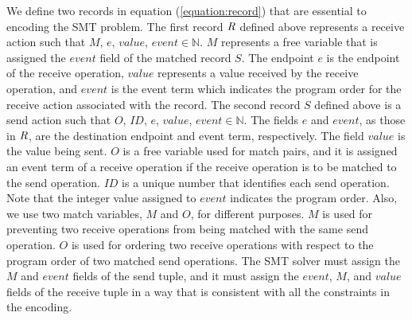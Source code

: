 We define two records in equation (\ref{equation:record}) that are essential to encoding the SMT problem. The first record $\emph{R}$ defined above represents a receive action such that $\mathit{M}$, $\mathit{e}$, $\mathit{value}$, $\mathit{event} \in \mathbb{N}$. $\mathit{M}$ represents a free variable that is assigned the $\mathit{event}$ field of the matched record $S$. The endpoint $\mathit{e}$ is the endpoint of the receive operation, $\mathit{value}$ represents a value received by the receive operation, and $\mathit{event}$ is the event term which indicates the program order for the receive action associated with the record. The second record $S$ defined above is a send action such that $\mathit{O}$, $\mathit{ID}$, $\mathit{e}$, $\mathit{value}$, $\mathit{event} \in \mathbb{N}$. The fields $\mathit{e}$ and $\mathit{event}$, as those in $\emph{R}$, are the destination endpoint and event term, respectively. The field $\mathit{value}$ is the value being sent. $\mathit{O}$ is a free variable used for match pairs, and it is assigned an event term of a receive operation if the receive operation is to be matched to the send operation. $\mathit{ID}$ is a unique number that identifies each send operation. Note that the integer value assigned to $\mathit{event}$ indicates the program order. Also, we use two match variables, $M$ and $\mathit{O}$, for different purposes. $M$ is used for preventing two receive operations from being matched with the same send operation. $\mathit{O}$ is used for ordering two receive operations with respect to the program order of two matched send operations. The SMT solver must assign the $\mathit{M}$ and $\mathit{event}$ fields of the send tuple, and it must assign the $\mathit{event}$, $\mathit{M}$, and $\mathit{value}$ fields of the receive tuple in a way that is consistent with all the constraints in the encoding.


